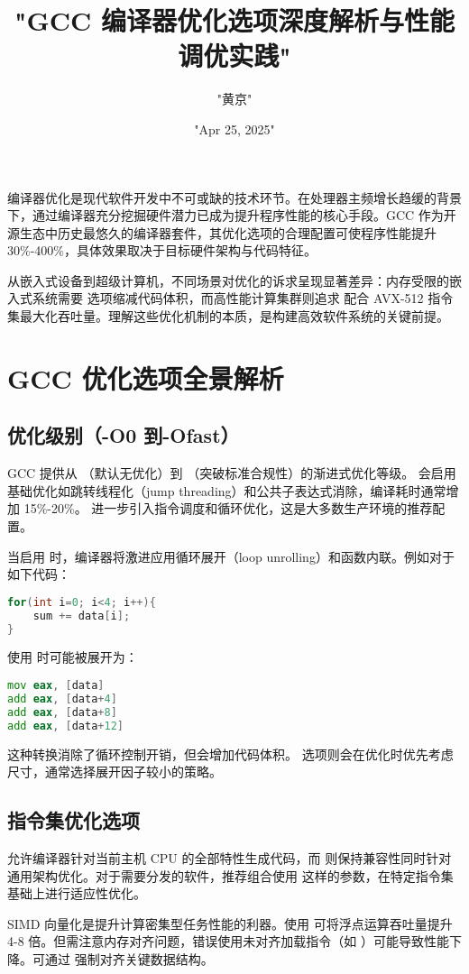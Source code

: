 \title{"GCC 编译器优化选项深度解析与性能调优实践"}
\author{"黄京"}
\date{"Apr 25, 2025"}
\maketitle
编译器优化是现代软件开发中不可或缺的技术环节。在处理器主频增长趋缓的背景下，通过编译器充分挖掘硬件潜力已成为提升程序性能的核心手段。GCC 作为开源生态中历史最悠久的编译器套件，其优化选项的合理配置可使程序性能提升 30\%{}-400\%{}，具体效果取决于目标硬件架构与代码特征。\par
从嵌入式设备到超级计算机，不同场景对优化的诉求呈现显著差异：内存受限的嵌入式系统需要  选项缩减代码体积，而高性能计算集群则追求  配合 AVX-512 指令集最大化吞吐量。理解这些优化机制的本质，是构建高效软件系统的关键前提。\par
\chapter{GCC 优化选项全景解析}
\section{优化级别（-O0 到-Ofast）}
GCC 提供从 （默认无优化）到 （突破标准合规性）的渐进式优化等级。 会启用基础优化如跳转线程化（jump threading）和公共子表达式消除，编译耗时通常增加 15\%{}-20\%{}。 进一步引入指令调度和循环优化，这是大多数生产环境的推荐配置。\par
当启用  时，编译器将激进应用循环展开（loop unrolling）和函数内联。例如对于如下代码：\par
\begin{lstlisting}[language=c]
for(int i=0; i<4; i++){
    sum += data[i];
}
\end{lstlisting}
使用  时可能被展开为：\par
\begin{lstlisting}[language=asm]
mov eax, [data]
add eax, [data+4]
add eax, [data+8]
add eax, [data+12]
\end{lstlisting}
这种转换消除了循环控制开销，但会增加代码体积。 选项则会在优化时优先考虑尺寸，通常选择展开因子较小的策略。\par
\section{指令集优化选项}
 允许编译器针对当前主机 CPU 的全部特性生成代码，而  则保持兼容性同时针对通用架构优化。对于需要分发的软件，推荐组合使用  这样的参数，在特定指令集基础上进行适应性优化。\par
SIMD 向量化是提升计算密集型任务性能的利器。使用  可将浮点运算吞吐量提升 4-8 倍。但需注意内存对齐问题，错误使用未对齐加载指令（如 ）可能导致性能下降。可通过  强制对齐关键数据结构。\par
